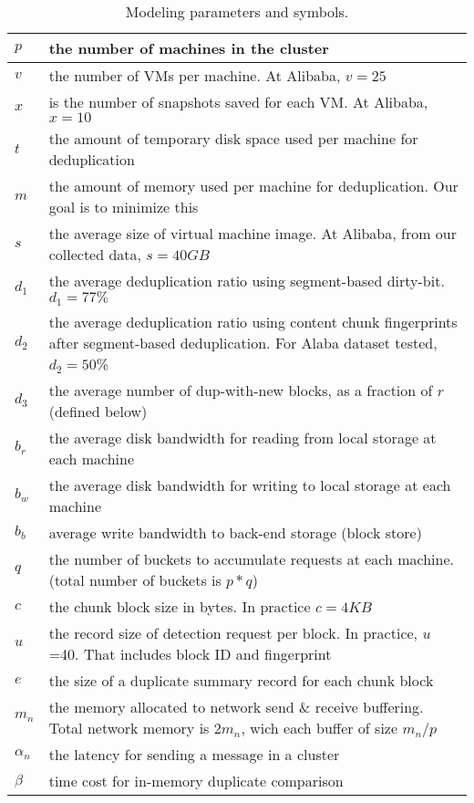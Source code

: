 \begin{table}[ht]
\centering
\begin{tabular}{|p{1.25cm}|p{6.5cm}|}
\hline
$p$ &  the number of machines in the cluster\\ 
\hline
$v$ & the number of VMs per machine. At Alibaba, $v=25$\\
\hline
$x$ & is the number of snapshots saved for each VM. At Alibaba, $x=10$\\
\hline
$t$ & the amount of temporary disk space used per machine for deduplication\\
\hline
$m$ & the amount of memory used per machine for deduplication. Our goal is to minimize this\\
\hline
$s$ & the average size of virtual machine image. At Alibaba, from our collected data, $s=40GB$\\
\hline
$d_1$ & the average  deduplication ratio using segment-based dirty-bit. $d_1=77\%$\\
\hline
$d_2$ & the average  deduplication ratio using content chunk fingerprints after segment-based deduplication. For Alaba dataset tested,  $d_2=50$\%\\
\hline
$d_3$ & the average number of dup-with-new blocks, as a fraction of $r$ (defined below)\\
\hline
$b_r$ & the average disk bandwidth for reading from local storage at each machine\\
\hline
$b_w$ & the average disk bandwidth for writing to local storage at each machine\\
\hline
$b_b$ & average write bandwidth to back-end storage (block store)\\
\hline
$q$ & the number of buckets to accumulate requests at each machine. (total number of buckets is $p*q$)\\
\hline
$c$ & the chunk block size in bytes.  In practice $c=4KB$\\
\hline
$u$ & the record size of detection request per block.  In practice, $u$=40. That includes block ID and fingerprint\\
\hline
$e$ & the size of a duplicate summary record for each chunk block\\
\hline
$m_n$ & the memory allocated to network send \& receive buffering. Total network memory is $2m_n$, wich each buffer of size $m_n/p$\\
\hline
$\alpha_n$ & the latency for sending a message in a cluster\\
\hline
$\beta$ & time cost for in-memory duplicate comparison\\
\hline
\end{tabular}
\caption{Modeling  parameters and symbols.}
\label{tab:symbol}
\end{table}

